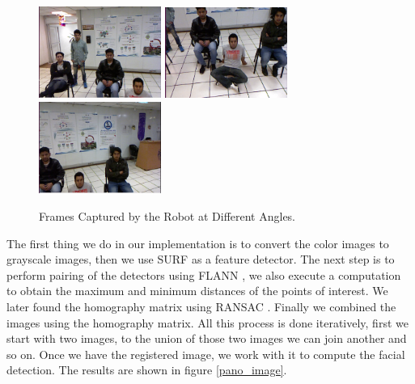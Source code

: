 \documentclass{llncs}
\begin{document}
\begin {figure}[h]
	\centering
	\includegraphics[angle=0, height= 3cm, width=4cm]{Figures/pano3.png}
	\includegraphics[angle=0, height= 3cm, width=4cm]{Figures/pano2.png}
	\includegraphics[angle=0, height= 3cm, width=4cm]{Figures/pano1.png}
	\caption{Frames Captured by the Robot at Different Angles.}
	\label{frames}
\end {figure}

The first thing we do in our implementation is to convert the color images to grayscale images, then we use SURF \cite{surf} as a feature detector. The next step is to perform pairing of the detectors using FLANN \cite{flann}, we also execute a computation to obtain the maximum and minimum distances of the points of interest. We later found the homography matrix using RANSAC \cite{ransac}. Finally we combined the images using the homography matrix. All this process is done iteratively, first we start with two images, to the union of those two images we can join another and so on. Once we have the registered image, we work with it to compute the facial detection. The results are shown in figure \ref{pano_image}.
\end{document}

